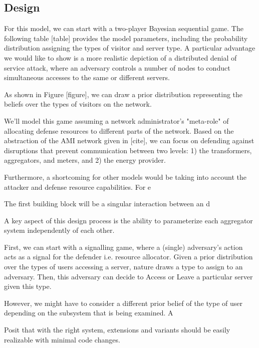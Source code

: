     \subsection{Design}
For this model, we can start with a two-player Bayesian sequential game. The following table [table] provides the model parameters, including the probability distribution assigning the types of visitor and server type. A particular advantage we would like to show is a more realistic depiction of a distributed denial of service attack, where an adversary controls a number of nodes to conduct simultaneous accesses to the same or different servers.

As shown in Figure [figure], we can draw a prior distribution representing the beliefs over the types of visitors on the network. 

We'll model this game assuming a network administrator's "meta-role" of allocating defense resources to different parts of the network. Based on the abstraction of the AMI network given in [cite], we can focus on defending against disruptions that prevent communication between two levels: 1) the transformers, aggregators, and meters, and 2) the energy provider.  

Furthermore, a shortcoming for other models would be taking into account the attacker and defense resource capabilities. For e

The first building block will be a singular interaction between an d 

A key aspect of this design process is the ability to parameterize each aggregator system independently of each other. 

First, we can start with a signalling game, where a (single) adversary's action acts as a signal for the defender i.e. resource allocator. Given a prior distribution over the types of users accessing a server, nature draws a type to assign to an adversary. Then, this adversary can decide to Access or Leave a particular server given this type. 

However, we might have to consider a different prior belief of the type of user depending on the subsystem that is being examined. A 

Posit that with the right system, extensions and variants should be easily realizable with minimal code changes.
